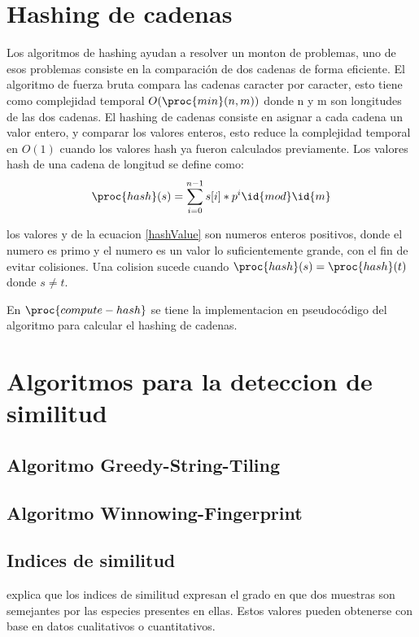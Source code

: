 \section{Hashing de cadenas}
Los algoritmos de hashing ayudan a resolver un monton de problemas, uno de esos problemas consiste en la comparación de dos cadenas de forma eficiente. El algoritmo de fuerza bruta compara las cadenas caracter por caracter, esto tiene como complejidad temporal $O(\proc{min}(n,m))$ donde n y m son longitudes de las dos cadenas. El hashing de cadenas consiste en asignar a cada cadena un valor entero, y comparar los valores enteros, esto reduce la complejidad temporal en $O(1)$ cuando los valores hash ya fueron calculados previamente. Los valores hash de una cadena  de longitud  se define como:
\begin{equation}
  \proc{hash}(s) = \sum_{i=0}^{n-1}{s[i]*p^i \id{mod} \id{m}}
\label{hashValue}
\end{equation}

los valores  y  de la ecuacion \ref{hashValue} son numeros enteros positivos, donde el numero  es primo y el numero  es un valor lo suficientemente grande, con el fin de evitar colisiones. Una colision sucede cuando $\proc{hash}(s)=\proc{hash}(t)$ donde $s \neq t$.

En $\proc{compute-hash}$ se tiene la implementacion en pseudocódigo del algoritmo para calcular el hashing de cadenas.



\section{Algoritmos para la deteccion de similitud}
\subsection{Algoritmo Greedy-String-Tiling}
\subsection{Algoritmo Winnowing-Fingerprint}

\subsection{Indices de similitud}
\cite{magurran1988} explica que los indices de similitud expresan el grado en que dos muestras son semejantes por las especies presentes en ellas. Estos valores pueden obtenerse con base en datos cualitativos o cuantitativos.

